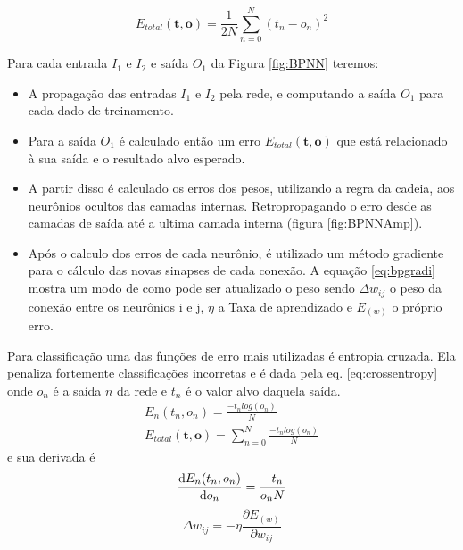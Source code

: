 \begin{equation}\label{eq:backpropagation}
E_{total}(\textbf{t},\textbf{o})  = \frac{1}{2N} \sum_{n=0}^{N} (t_n - o_n)^2
\end{equation}

Para cada entrada $I_{1}$ e $I_{2}$ e saída $O_{1}$ da Figura \ref{fig:BPNN} teremos:
\begin{itemize}
	\item A propagação das entradas $I_{1}$ e $I_{2}$ pela rede, e computando a saída $O_{1}$ para cada dado de treinamento.
	\item Para a saída $O_{1}$ é calculado então um erro $E_{total}(\textbf{t},\textbf{o})$ que está relacionado \`a sua sa\'ida e o resultado alvo esperado.
	\item A partir disso é calculado os erros dos pesos, utilizando a regra da cadeia, aos neurônios ocultos das camadas internas. Retropropagando o erro desde as camadas de saída até a ultima camada interna (figura \ref{fig:BPNNAmp}).
	\item Após o calculo dos erros de cada neur\^onio, é utilizado um método gradiente para o cálculo das novas sinapses de cada conexão. A equação \ref{eq:bpgradi} mostra um modo de como pode ser atualizado o peso sendo $\Delta w_{ij}$ o peso da conexão entre os neurônios i e j, $\eta$ a Taxa de aprendizado e $E_(w)$ o próprio erro. 
\end{itemize}
\par
Para classifica\c{c}\~ao uma das fun\c{c}\~oes de erro mais utilizadas \'e entropia cruzada.
Ela penaliza fortemente classifica\c{c}\~oes incorretas e \'e dada pela eq. \ref{eq:crossentropy} onde $o_n$ \'e a sa\'ida $n$ da rede e $t_n$ \'e o valor alvo daquela sa\'ida.
\begin{eqnarray}\label{eq:crossentropy}
E_n(t_n,o_n) = \frac{-t_n log(o_n)}{N}\\
E_{total}(\textbf{t},\textbf{o}) = \sum_{n=0}^{N} \frac{-t_n log(o_n)}{N}
\end{eqnarray}
e sua derivada \'e
\begin{equation}\label{eq:divcrossentropy}
\dv{E_n(t_n,o_n)}{o_n} = \frac{-t_n}{o_n N}\\
\end{equation}
\begin{equation}\label{eq:bpgradi}
\Delta w_{ij} = -\eta \frac{\partial E_(w) }{\partial w_{ij}}
\end{equation}


